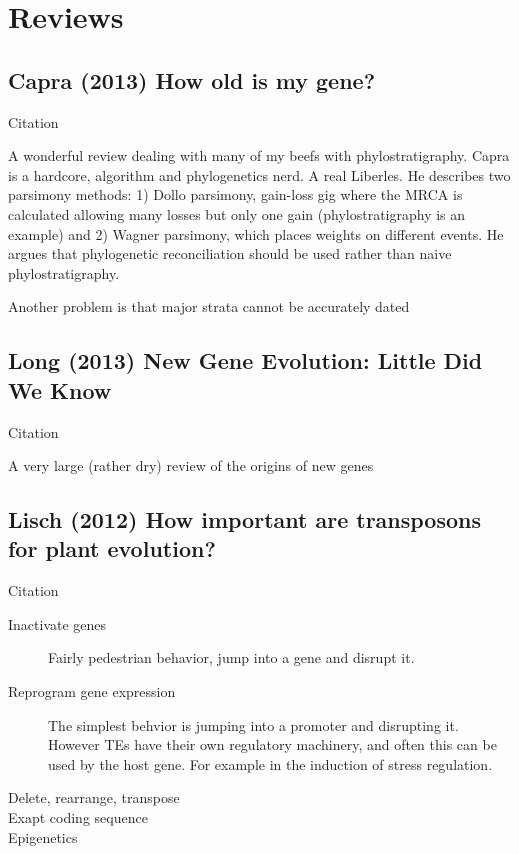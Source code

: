 \section{Reviews}
\subsection{Capra (2013) How old is my gene?}
    Citation \cite{capra_how_2013}

    A wonderful review dealing with many of my beefs with phylostratigraphy.
    Capra is a hardcore, algorithm and phylogenetics nerd. A real Liberles. He
    describes two parsimony methods: 1) Dollo parsimony, gain-loss gig where
    the MRCA is calculated allowing many losses but only one gain
    (phylostratigraphy is an example) and 2) Wagner parsimony, which places
    weights on different events. He argues that phylogenetic reconciliation
    should be used rather than naive phylostratigraphy.



    Another problem is that major strata cannot be accurately dated


\subsection{Long (2013) New Gene Evolution: Little Did We Know}
    Citation \cite{long_new_2013}

    A very large (rather dry) review of the origins of new genes

\subsection{Lisch (2012) How important are transposons for plant evolution?}
    Citation \cite{lisch_how_2012}
    
    \begin{description}
        \item[Inactivate genes] Fairly pedestrian behavior, jump into a gene and disrupt it.
        \item[Reprogram gene expression] The simplest behvior is jumping into a
            promoter and disrupting it. However TEs have their own regulatory
            machinery, and often this can be used by the host gene. For example
            in the induction of stress regulation.
        \item[Delete, rearrange, transpose] 
        \item[Exapt coding sequence]
        \item[Epigenetics]
    \end{description}

